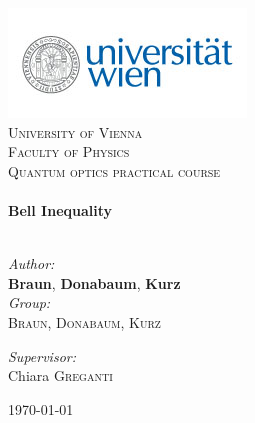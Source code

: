 \begin{titlepage}
\begin{center}

\includegraphics[scale=0.75]{./unilogo}~\\[2cm]

\textsc{\LARGE University of Vienna }\\[0.5cm]
\textsc{\LARGE Faculty of Physics}\\[1.5cm]
\textsc{\Large Quantum optics practical course}\\[0.5cm]

\HRule \\[0.4cm]
{ \huge \bfseries Bell Inequality}\\[0.4cm]

\HRule \\[1.5cm]

\begin{minipage}{0.4\textwidth}
\begin{flushleft} \large
\emph{Author:}\\
\textbf{Braun}, \textbf{Donabaum}, \textbf{Kurz}\\
\emph{Group:}\\
\textsc{Braun, Donabaum, Kurz}\\
\end{flushleft}
\end{minipage}
\begin{minipage}{0.4\textwidth}
\begin{flushright} \large
\emph{Supervisor:} \\
Chiara \textsc{Greganti}
\end{flushright}
\end{minipage}

\vfill

{\large \today}

\end{center}
\end{titlepage}